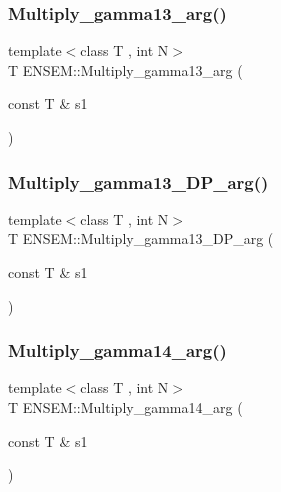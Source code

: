 \mbox{\label{namespaceENSEM_ada6a9330c7a86fb18f76313b549d202c}} 
\subsubsection{\texorpdfstring{Multiply\_gamma13\_arg()}{Multiply\_gamma13\_arg()}}
{\footnotesize\ttfamily template$<$class T , int N$>$ \\
T E\+N\+S\+E\+M\+::\+Multiply\+\_\+gamma13\+\_\+arg (\begin{DoxyParamCaption}\item[{const T \&}]{s1 }\end{DoxyParamCaption})\hspace{0.3cm}{\ttfamily [inline]}}

\mbox{\label{namespaceENSEM_a48323c568aeb5bcdc0c398521f124a66}} 
\subsubsection{\texorpdfstring{Multiply\_gamma13\_DP\_arg()}{Multiply\_gamma13\_DP\_arg()}}
{\footnotesize\ttfamily template$<$class T , int N$>$ \\
T E\+N\+S\+E\+M\+::\+Multiply\+\_\+gamma13\+\_\+\+D\+P\+\_\+arg (\begin{DoxyParamCaption}\item[{const T \&}]{s1 }\end{DoxyParamCaption})\hspace{0.3cm}{\ttfamily [inline]}}

\mbox{\label{namespaceENSEM_a51519aac850a9e91ae4b8290df023859}} 
\subsubsection{\texorpdfstring{Multiply\_gamma14\_arg()}{Multiply\_gamma14\_arg()}}
{\footnotesize\ttfamily template$<$class T , int N$>$ \\
T E\+N\+S\+E\+M\+::\+Multiply\+\_\+gamma14\+\_\+arg (\begin{DoxyParamCaption}\item[{const T \&}]{s1 }\end{DoxyParamCaption})\hspace{0.3cm}{\ttfamily [inline]}}


